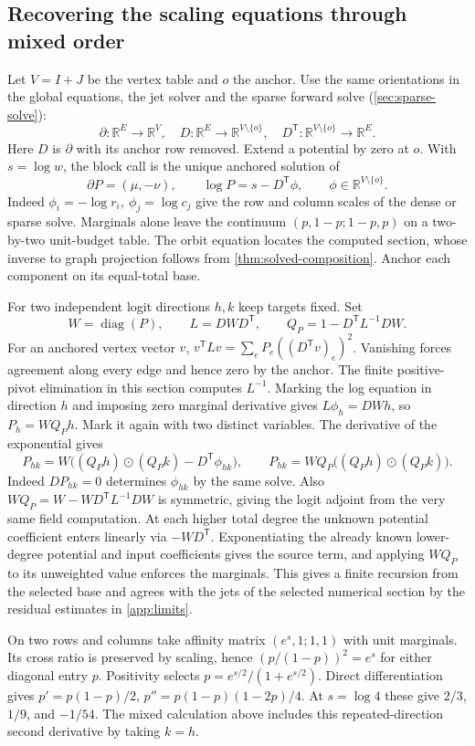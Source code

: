 \documentclass[11pt,a4paper]{article}
\theoremstyle{definition}
\theoremstyle{remark}\newaliascnt{remark}{theorem}
\newcommand{\R}{\mathbb R}
\numberwithin{equation}{section}
\begin{document}
\subsection{Recovering the scaling equations through mixed order}
Let \(V=I+J\) be the vertex table and \(o\) the anchor. Use the same orientations in the global equations, the jet solver and the sparse forward solve (\cref{sec:sparse-solve}):
\[
 \partial:\R^E\to\R^V,\quad
 D:\R^E\to\R^{V\setminus\{o\}},\quad
 D^{\mathsf T}:\R^{V\setminus\{o\}}\to\R^E .
\]
Here \(D\) is \(\partial\) with its anchor row removed. Extend a potential by zero at \(o\). With \(s=\log w\), the block call is the unique anchored solution of
\[
 \partial P=(\mu,-\nu),\qquad
 \log P=s-D^{\mathsf T}\phi,\qquad \phi\in\R^{V\setminus\{o\}} .
\]
Indeed \(\phi_i=-\log r_i,\ \phi_j=\log c_j\) give the row and column scales of the dense or sparse solve. Marginals alone leave the continuum \((p,1-p;1-p,p)\) on a two-by-two unit-budget table. The orbit equation locates the computed section, whose inverse to graph projection follows from \cref{thm:solved-composition}. Anchor each component on its equal-total base.

For two independent logit directions $h,k$ keep targets fixed. Set
\[
 W=\operatorname{diag}(P),\qquad L=DWD^{\mathsf{T}},\qquad
 Q_P=1-D^{\mathsf{T}}L^{-1}DW .
\]
For an anchored vertex vector $v$, $v^{\mathsf{T}}Lv=\sum_eP_e((D^{\mathsf{T}}v)_e)^2$. Vanishing forces agreement along every edge and hence zero by the anchor. The finite positive-pivot elimination in this section computes $L^{-1}$. Marking the log equation in direction $h$ and imposing zero marginal derivative gives $L\phi_h=DWh$, so $P_h=WQ_Ph$. Mark it again with two distinct variables. The derivative of the exponential gives
\[
 P_{hk}=W\big((Q_Ph)\odot(Q_Pk)-D^{\mathsf{T}}\phi_{hk}\big),\qquad
 P_{hk}=WQ_P\big((Q_Ph)\odot(Q_Pk)\big).
\]
Indeed $DP_{hk}=0$ determines $\phi_{hk}$ by the same solve. Also $WQ_P=W-WD^{\mathsf{T}}L^{-1}DW$ is symmetric, giving the logit adjoint from the very same field computation. At each higher total degree the unknown potential coefficient enters linearly via $-WD^{\mathsf{T}}$. Exponentiating the already known lower-degree potential and input coefficients gives the source term, and applying $WQ_P$ to its unweighted value enforces the marginals. This gives a finite recursion from the selected base and agrees with the jets of the selected numerical section by the residual estimates in \cref{app:limits}.

On two rows and columns take affinity matrix $(e^s,1;1,1)$ with unit marginals. Its cross ratio is preserved by scaling, hence $(p/(1-p))^2=e^s$ for either diagonal entry $p$. Positivity selects $p=e^{s/2}/(1+e^{s/2})$. Direct differentiation gives $p'=p(1-p)/2$, $p''=p(1-p)(1-2p)/4$. At $s=\log4$ these give $2/3$, $1/9$, and $-1/54$. The mixed calculation above includes this repeated-direction second derivative by taking $k=h$.
\end{document}
